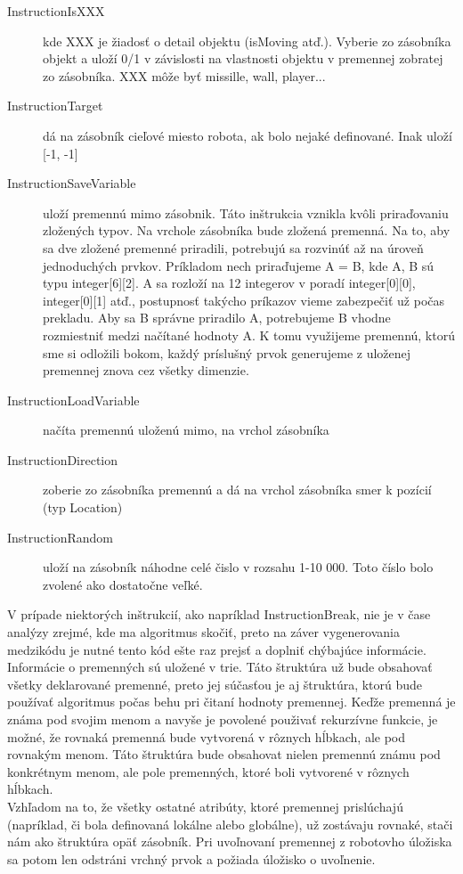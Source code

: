 \begin{description}
\item [InstructionIsXXX] kde XXX je žiadosť o detail objektu (isMoving atď.). Vyberie zo zásobníka objekt a uloží 0/1 v závislosti na vlastnosti objektu v premennej zobratej zo zásobníka. XXX môže byť missille, wall, player...
\item [InstructionTarget] dá na zásobník cieľové miesto robota, ak bolo nejaké definované. Inak uloží [-1, -1]
\item [InstructionSaveVariable] uloží premennú mimo zásobnik. Táto inštrukcia vznikla kvôli priraďovaniu zložených typov. Na vrchole zásobníka bude zložená premenná. Na to, aby sa dve zložené premenné priradili, potrebujú sa rozvinúť až na úroveň jednoduchých prvkov. Príkladom nech priraďujeme A = B, kde A, B sú typu integer[6][2]. A sa rozloží na 12 integerov v poradí integer[0][0], integer[0][1] atď., postupnosť takýcho príkazov vieme zabezpečiť už počas prekladu. Aby sa B správne priradilo A, potrebujeme B vhodne rozmiestniť medzi načítané hodnoty A. K tomu využijeme premennú, ktorú sme si odložili bokom, každý príslušný prvok generujeme z uloženej premennej znova cez všetky dimenzie.
\item [InstructionLoadVariable] načíta premennú uloženú mimo, na vrchol zásobníka
\item [InstructionDirection] zoberie zo zásobníka premennú a dá na vrchol zásobníka smer k pozícií (typ Location)
\item [InstructionRandom] uloží na zásobník náhodne celé čislo v rozsahu 1-10 000. Toto číslo bolo zvolené ako dostatočne veľké. %
\end{description}

V prípade niektorých inštrukcií, ako napríklad InstructionBreak, nie je v čase analýzy zrejmé, kde ma algoritmus skočiť, preto na záver vygenerovania medzikódu je nutné tento kód ešte raz prejsť a doplniť chýbajúce informácie. \\

Informácie o premenných sú uložené v trie. %
Táto štruktúra už bude obsahovať všetky deklarované premenné, preto jej súčasťou je aj štruktúra, ktorú bude používať algoritmus počas behu pri čitaní hodnoty premennej. Keďže premenná je známa pod svojim menom a navyše je povolené použivať rekurzívne funkcie, je možné, že rovnaká premenná bude vytvorená v rôznych hĺbkach, ale pod rovnakým menom. Táto štruktúra bude obsahovat nielen premennú známu pod konkrétnym menom, ale pole premenných, ktoré boli vytvorené v rôznych hĺbkach.\\
Vzhľadom na to, že všetky ostatné atribúty, ktoré premennej prislúchajú (napríklad, či bola definovaná lokálne alebo globálne), už zostávaju rovnaké, stači nám ako štruktúra opäť zásobník. Pri uvoľnovaní premennej z robotovho úložiska sa potom  len odstráni vrchný prvok a požiada úložisko o uvoľnenie.

